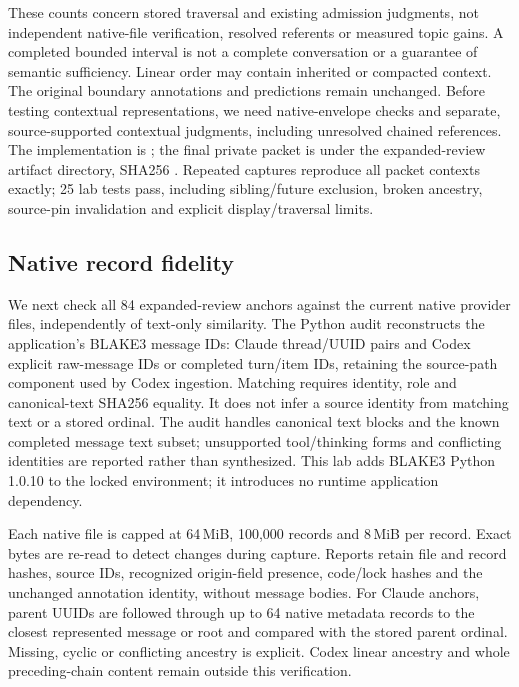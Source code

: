 \documentclass[11pt]{article}
\begin{document}
These counts concern stored traversal and existing admission judgments, not
independent native-file verification, resolved referents or measured topic gains.
A completed bounded interval is not a complete conversation or a guarantee of
semantic sufficiency. Linear order may contain inherited or compacted context.
The original boundary annotations and predictions remain unchanged. Before
testing contextual representations, we need native-envelope checks and separate,
source-supported contextual judgments, including unresolved chained references.
The implementation is ; the final
private packet is  under the expanded-review
artifact directory, SHA256
.
Repeated captures reproduce all packet contexts exactly; 25 lab tests pass,
including sibling/future exclusion, broken ancestry, source-pin invalidation
and explicit display/traversal limits.

\subsection{Native record fidelity}
We next check all 84 expanded-review anchors against the current native provider
files, independently of text-only similarity. The Python audit reconstructs
the application's BLAKE3 message IDs: Claude thread/UUID pairs and Codex explicit
raw-message IDs or completed turn/item IDs, retaining the source-path component
used by Codex ingestion. Matching requires identity, role and canonical-text
SHA256 equality. It does not infer a source identity from matching text or a
stored ordinal. The audit handles canonical text blocks and the known completed
message text subset; unsupported tool/thinking forms and conflicting identities
are reported rather than synthesized. This lab adds BLAKE3 Python 1.0.10 to the
locked environment; it introduces no runtime application dependency.

Each native file is capped at 64\,MiB, 100,000 records and 8\,MiB per record.
Exact bytes are re-read to detect changes during capture. Reports retain file
and record hashes, source IDs, recognized origin-field presence, code/lock hashes
and the unchanged annotation identity, without message bodies. For Claude
anchors, parent UUIDs are followed through up to 64 native metadata records to
the closest represented message or root and compared with the stored parent
ordinal. Missing, cyclic or conflicting ancestry is explicit. Codex linear
ancestry and whole preceding-chain content remain outside this verification.
\end{document}
